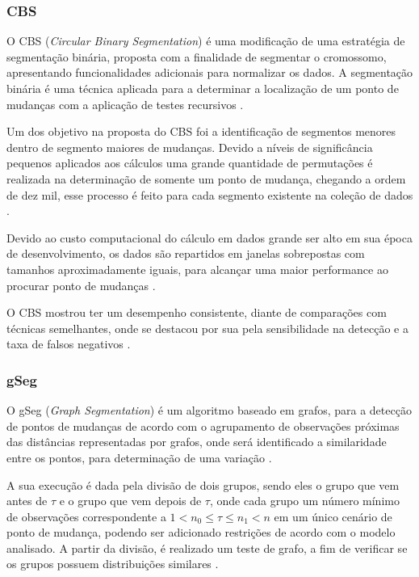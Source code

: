 \subsubsection{CBS}

O CBS (\textit{Circular Binary Segmentation}) é uma modificação de uma estratégia de segmentação binária, proposta com a finalidade de segmentar o cromossomo, apresentando funcionalidades adicionais para normalizar os dados. A segmentação binária é uma técnica aplicada para a determinar a localização de um ponto de mudanças com a aplicação de testes recursivos \cite{Olshen2004}.

Um dos objetivo na proposta do CBS foi a identificação de segmentos menores dentro de segmento maiores de mudanças. Devido a níveis de significância pequenos aplicados aos cálculos uma grande quantidade de permutações é realizada na determinação de somente um ponto de mudança, chegando a ordem de dez mil, esse processo é feito para cada segmento existente na coleção de dados \cite{Olshen2004}.

Devido ao custo computacional do cálculo em dados grande ser alto em sua época de desenvolvimento, os dados são repartidos em janelas sobrepostas com tamanhos aproximadamente iguais, para alcançar uma maior performance ao procurar ponto de mudanças \cite{Olshen2004}.

O CBS mostrou ter um desempenho consistente, diante de comparações com técnicas semelhantes, onde se destacou por sua pela sensibilidade na detecção e a taxa de falsos negativos \cite{Hsu2011}.


\subsubsection{gSeg}

O gSeg (\textit{Graph Segmentation}) é um algoritmo baseado em grafos, para a detecção de pontos de mudanças de acordo com o agrupamento de observações próximas das distâncias representadas por grafos, onde será identificado a similaridade entre os pontos, para determinação de uma variação 
\cite{Chen2015}. 

A sua execução é dada pela divisão de dois grupos, sendo eles o grupo que vem antes de $\tau$ e o grupo que vem depois de $\tau$, onde cada grupo um número mínimo de observações correspondente a $1 < n_{0} \leq \tau \leq n_{1} < n$ em um único cenário de ponto de mudança, podendo ser adicionado restrições de acordo com o modelo analisado. A partir da divisão, é realizado um teste de grafo, a fim de verificar se os grupos possuem distribuições similares \cite{Chen2015}. 

